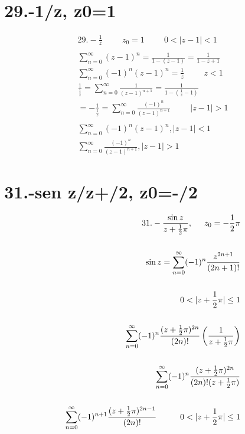 \documentclass{article}
\begin{document}
\section*{29.-1/z, z0=1 }
\begin{align*}
29.- \frac{1}{z} \hspace{1cm} z_0 = 1 \hspace{1cm} 0 < |z-1| < 1 \\
\\
\sum_{n=0}^\infty (z-1)^n = \frac{1}{1-(z-1)} = \frac{1}{1-z+1} \\
\sum_{n=0}^\infty (-1)^n (z-1)^n = \frac{1}{z} \hspace{1cm} z < 1 \\
\frac{1}{\frac{1}{z}} = \sum_{n=0}^\infty \frac{1}{(z-1)^{n+1}} = \frac{1}{1-(\frac{1}{z} - 1)} \\
= - \frac{1}{\frac{1}{z}} = \sum_{n=0}^\infty \frac{(-1)^n}{(z-1)^{n+1}} \hspace{1cm} |z-1| > 1 \\
\\
\sum_{n=0}^\infty (-1)^n (z-1)^n, |z-1| < 1 \\
\sum_{n=0}^\infty \frac{(-1)^n}{(z-1)^{n+1}}, |z-1| > 1
\end{align*}
\section*{31.-sen z/z+\pi /2, z0=-\pi/2 }
\begin{align*}
31.- \frac{\sin z}{z + \frac{1}{2}\pi}, \hspace{0.5cm} z_0 = -\frac{1}{2}\pi \\
\\
\sin z = \sum_{n=0}^\infty (-1)^n \frac{z^{2n+1}}{(2n+1)!} \\
\\
0 < |z + \frac{1}{2}\pi| \le 1 \\
\\
\sum_{n=0}^\infty (-1)^n \frac{(z+\frac{1}{2}\pi)^{2n}}{(2n)!} \left( \frac{1}{z + \frac{1}{2}\pi} \right) \\
\\
\sum_{n=0}^\infty (-1)^n \frac{(z+\frac{1}{2}\pi)^{2n}}{(2n)!(z + \frac{1}{2}\pi)} \\
\\
\sum_{n=0}^\infty (-1)^{n+1} \frac{(z+\frac{1}{2}\pi)^{2n-1}}{(2n)!} \hspace{1cm} 0 < |z + \frac{1}{2}\pi| \le 1
\end{align*}
\end{document}
